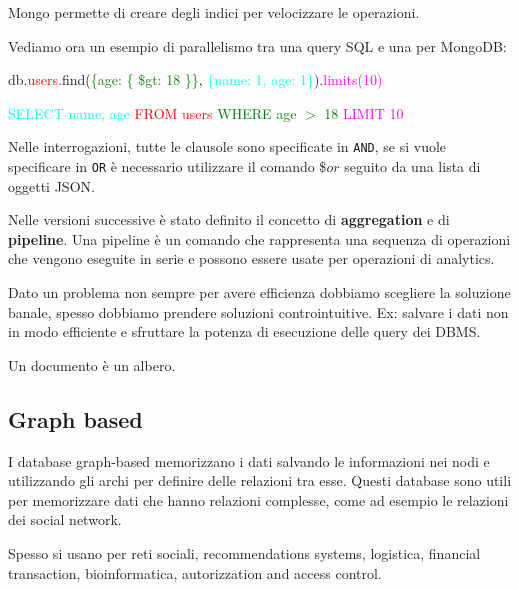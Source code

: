 Mongo permette di creare degli indici per velocizzare le operazioni.
\begin{esempio}
      Vediamo ora un esempio di parallelismo tra una query SQL e una per
      MongoDB:
      \begin{center}
            db.\textcolor{red}{users}.find(\textcolor{green}{\{age: \{ \$gt: 18 \}\}},
            \textcolor{cyan}{\{name: 1, age: 1\}}).\textcolor{magenta}{limits(10)}
      \end{center}
      \begin{center}
            \textcolor{cyan}{SELECT name, age} \textcolor{red}{FROM users}
            \textcolor{green}{WHERE age $>$ 18} \textcolor{magenta}{LIMIT 10}
      \end{center}
\end{esempio}
Nelle interrogazioni, tutte le clausole sono specificate in \texttt{AND}, se si
vuole specificare in \texttt{OR} è necessario utilizzare il comando \$$or$ seguito
      da una lista di oggetti JSON.

      Nelle versioni successive è stato definito il concetto di \textbf{aggregation} e
      di \textbf{pipeline}. Una pipeline è un comando che rappresenta una sequenza di
      operazioni che vengono eseguite in serie e possono essere usate per operazioni
      di analytics.

      \begin{nota}
            Dato un problema non sempre per avere efficienza dobbiamo scegliere la
            soluzione banale, spesso dobbiamo prendere soluzioni controintuitive. Ex:
            salvare i dati non in modo efficiente e sfruttare la potenza di esecuzione
            delle query dei DBMS.
      \end{nota}
      \begin{nota}
            Un documento è un albero.
      \end{nota}
      \subsection{Graph based}
      I database graph-based memorizzano i dati salvando le informazioni nei nodi e
      utilizzando gli archi per definire delle relazioni tra esse. Questi database sono
      utili per memorizzare dati che hanno relazioni complesse, come ad esempio le
      relazioni dei social network.

      Spesso si usano per reti sociali, recommendations systems, logistica, financial
      transaction, bioinformatica, autorizzation and access control.

